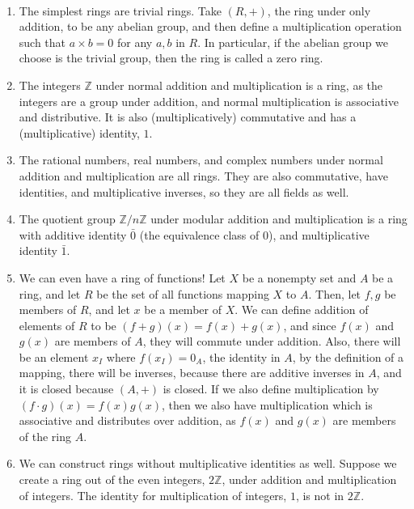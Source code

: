 \documentclass{article}
\begin{document}
\begin{example}
    \
\begin{enumerate}
    \item The simplest rings are trivial rings. Take $(R,+)$, the ring under only addition, to be any abelian group, and then define a multiplication operation such that $a\times b = 0$ for any $a,b$ in $R$. In particular, if the abelian group we choose is the trivial group, then the ring is called a zero ring. 
    \item The integers $\mathbb{Z}$ under normal addition and multiplication is a ring, as the integers are a group under addition, and normal multiplication is associative and distributive. It is also (multiplicatively) commutative and has a (multiplicative) identity, $1$.
    \item The rational numbers, real numbers, and complex numbers under normal addition and multiplication are all rings. They are also commutative, have identities, and multiplicative inverses, so they are all fields as well.
    \item The quotient group $\mathbb{Z}/n\mathbb{Z}$ under modular addition and multiplication is a ring with additive identity $\bar{0}$ (the equivalence class of $0$), and multiplicative identity $\bar{1}$. 
    \item We can even have a ring of functions! Let $X$ be a nonempty set and $A$ be a ring, and let $R$ be the set of all functions mapping $X$ to $A$. Then, let $f, g$ be members of $R$, and let $x$ be a member of $X$. We can define addition of elements of $R$ to be $(f+g)(x) = f(x) + g(x)$, and since $f(x)$ and $g(x)$ are members of $A$, they will commute under addition. Also, there will be an element $x_I$ where $f(x_I) = 0_A$, the identity in $A$, by the definition of a mapping, there will be inverses, because there are additive inverses in $A$, and it is closed because $(A,+)$ is closed. If we also define multiplication by $(f\cdot g)(x) = f(x)g(x)$, then we also have multiplication which is associative and distributes over addition, as $f(x)$ and $g(x)$ are members of the ring $A$. 
    \item We can construct rings without multiplicative identities as well. Suppose we create a ring out of the even integers, $2\mathbb{Z}$, under addition and multiplication of integers. The identity for multiplication of integers, $1$, is not in $2\mathbb{Z}$. 
\end{enumerate}
\end{example}
\end{document}
